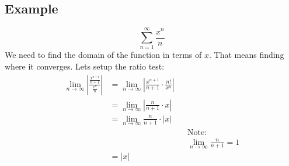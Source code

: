 \documentclass{article}
\begin{document}
    \subsection{Example}
        \[\sum_{n=1}^{\infty}  \frac{x^n}{n}\]
        We need to find the domain of the function in terms of \(x\).
        That means finding where it converges.
        Lets setup the ratio test:
        \begin{align*}
            \lim_{n \to \infty} \left| \frac{\frac{x^{n+1}}{n+1}}{\frac{x^n}{n}}\right|
            &= \lim_{n \to \infty} \left| \frac{x^{n+1}}{n+1} \cdot \frac{n!}{x^n}\right| \\
            &= \lim_{n \to \infty} \left| \frac{n}{n+1} \cdot x\right| \\
            &= \lim_{n \to \infty} \frac{n}{n+1} \cdot |x| \\
            && &\text{Note:} \\
            && &\lim_{n \to \infty} \frac{n}{n+1} = 1 \\
            &= |x|
        \end{align*}
        
   
\end{document}
